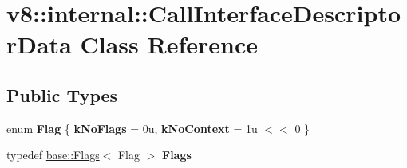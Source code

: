 \hypertarget{classv8_1_1internal_1_1CallInterfaceDescriptorData}{}\section{v8\+:\+:internal\+:\+:Call\+Interface\+Descriptor\+Data Class Reference}
\label{classv8_1_1internal_1_1CallInterfaceDescriptorData}
\subsection*{Public Types}
\begin{DoxyCompactItemize}
\item 
\mbox{\label{classv8_1_1internal_1_1CallInterfaceDescriptorData_a089ef50da245332139a2208278ad69d9}} 
enum {\bfseries Flag} \{ {\bfseries k\+No\+Flags} = 0u, 
{\bfseries k\+No\+Context} = 1u $<$$<$ 0
 \}
\item 
\mbox{\label{classv8_1_1internal_1_1CallInterfaceDescriptorData_acc2c3cb157f6aa28e0971cdbfacff2d8}} 
typedef \mbox{\hyperlink{classv8_1_1base_1_1Flags}{base\+::\+Flags}}$<$ Flag $>$ {\bfseries Flags}
\end{DoxyCompactItemize}
